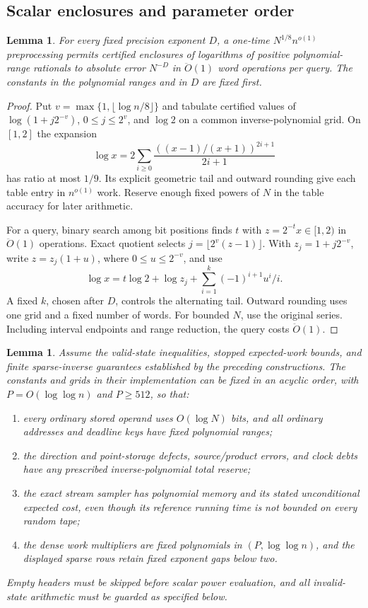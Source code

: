 \documentclass[11pt]{article}
\newtheorem{lemma}[theorem]{Lemma}
\theoremstyle{remark}
\renewcommand{\O}{\ddot{O}}
\begin{document}
\subsection{Scalar enclosures and parameter order}

\begin{lemma}
\label{lem:ram-stream-scalar}
For every fixed precision exponent $D$, a one-time $N^{1/8}n^{o(1)}$
preprocessing permits certified enclosures of logarithms of positive
polynomial-range rationals to absolute error $N^{-D}$ in $\O(1)$ word operations
per query.
The constants in the polynomial ranges and in $D$ are fixed first.
\end{lemma} \begin{proof}
Put $v=\max\{1,\lfloor \log n/8\rfloor\}$ and tabulate certified values of
$\log(1+j2^{-v})$, $0\le j\le2^v$, and $\log2$ on a common inverse-polynomial
grid.
On $[1,2]$ the expansion
\[
 \log x=2\sum_{i\ge0}\frac{((x-1)/(x+1))^{2i+1}}{2i+1}
\]
has ratio at most $1/9$.
Its explicit geometric tail and outward rounding give each table entry in
$n^{o(1)}$ work.
Reserve enough fixed powers of $N$ in the table accuracy for later arithmetic.

For a query, binary search among bit positions finds $t$ with
$z=2^{-t}x\in[1,2)$ in $\O(1)$ operations.
Exact quotient selects $j=\lfloor2^v(z-1)\rfloor$.
With $z_j=1+j2^{-v}$, write $z=z_j(1+u)$, where $0\le u\le2^{-v}$, and use
\[
 \log x=t\log2+\log z_j+
       \sum_{i=1}^{k}(-1)^{i+1}u^i/i.
\]
A fixed $k$, chosen after $D$, controls the alternating tail.
Outward rounding uses one grid and a fixed number of words.
For bounded $N$, use the original series.
Including interval endpoints and range reduction, the query costs $\O(1)$.
\end{proof}

\begin{lemma}
\label{lem:ram27-parameter-order}
Assume the valid-state inequalities, stopped expected-work bounds,
and finite sparse-inverse guarantees established by the preceding
constructions.  The constants and grids in their implementation can
be fixed in an acyclic order, with $P=O(\log\log n)$ and $P\ge512$, so that:
\begin{enumerate}
\item every ordinary stored operand uses $O(\log N)$ bits, and
all ordinary addresses and deadline keys have fixed polynomial ranges;
\item the direction and point-storage defects, source/product errors,
and clock debts have any prescribed inverse-polynomial total reserve;
\item the exact stream sampler has polynomial memory and its stated
unconditional expected cost, even though its reference running time
is not bounded on every random tape;
\item the dense work multipliers are fixed polynomials in $(P,\log\log n)$,
and the displayed sparse rows retain fixed exponent gaps below two.
\end{enumerate}
Empty headers must be skipped before scalar power evaluation, and
all invalid-state arithmetic must be guarded as specified below.
\end{lemma}
\end{document}
